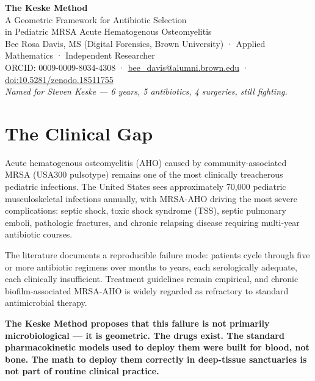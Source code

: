 \documentclass[11pt]{article}
\begin{document}
\begin{center}
  {\LARGE\bfseries The Keske Method}\\[6pt]
  {\large A Geometric Framework for Antibiotic Selection\\
  in Pediatric MRSA Acute Hematogenous Osteomyelitis}\\[10pt]
  {\color{muted}\small
  Bee Rosa Davis, MS (Digital Forensics, Brown University) · Applied Mathematics ·
  Independent Researcher \\
  ORCID: 0009-0009-8034-4308 · \href{mailto:bee_davis@alumni.brown.edu}{bee\_davis@alumni.brown.edu} ·
  \href{https://doi.org/10.5281/zenodo.18511755}{doi:10.5281/zenodo.18511755}}\\[4pt]
  {\color{dkred}\small\itshape
  Named for Steven Keske — 6 years, 5 antibiotics, 4 surgeries, still fighting.}
\end{center}

\vspace{6pt}

\section{The Clinical Gap}

Acute hematogenous osteomyelitis (AHO) caused by community-associated MRSA
(USA300 pulsotype) remains one of the most clinically treacherous pediatric
infections. The United States sees approximately 70,000 pediatric musculoskeletal
infections annually, with MRSA-AHO driving the most severe complications:
septic shock, toxic shock syndrome (TSS), septic pulmonary emboli, pathologic
fractures, and chronic relapsing disease requiring multi-year antibiotic courses.

The literature documents a reproducible failure mode: patients cycle through
five or more antibiotic regimens over months to years, each serologically
adequate, each clinically insufficient. Treatment guidelines remain empirical,
and chronic biofilm-associated MRSA-AHO is widely regarded as refractory to
standard antimicrobial therapy.

\textbf{The Keske Method proposes that this failure is not primarily
microbiological — it is geometric. The drugs exist. The standard pharmacokinetic
models used to deploy them were built for blood, not bone. The math to deploy
them correctly in deep-tissue sanctuaries is not part of routine clinical
practice.}

\end{document}
